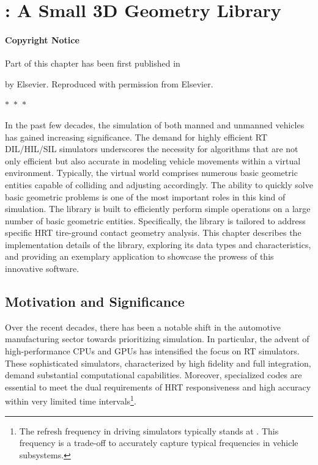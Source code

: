 
\chapter{\Acme{}: A Small 3D Geometry Library}
\label{app1:acme}

\subsubsection{Copyright Notice}
Part of this chapter has been first published in
%
\begin{center}
  \begin{minipage}{0.9\textwidth}
  \end{minipage}
\end{center}
%
by Elsevier. Reproduced with permission from Elsevier.

\begin{center}
  $\ast$~$\ast$~$\ast$
\end{center}

In the past few decades, the simulation of both manned and unmanned vehicles has gained increasing significance. The demand for highly efficient \ac{RT} \ac{DIL}/\ac{HIL}/\ac{SIL} simulators underscores the necessity for algorithms that are not only efficient but also accurate in modeling vehicle movements within a virtual environment. Typically, the virtual world comprises numerous basic geometric entities capable of colliding and adjusting accordingly. The ability to quickly solve basic geometric problems is one of the most important roles in this kind of simulation. The \Acme{} library is built to efficiently perform simple operations on a large number of basic geometric entities. Specifically, the library is tailored to address specific \ac{HRT} tire-ground contact geometry analysis. This chapter describes the implementation details of the \Acme{} library, exploring its data types and characteristics, and providing an exemplary application to showcase the prowess of this innovative software.


\section{Motivation and Significance}
\label{app1:acme_motivation}

Over the recent decades, there has been a notable shift in the automotive manufacturing sector towards prioritizing simulation. In particular, the advent of high-performance \acp{CPU} and \acp{GPU} has intensified the focus on \ac{RT} simulators. These sophisticated simulators, characterized by high fidelity and full integration, demand substantial computational capabilities. Moreover, specialized codes are essential to meet the dual requirements of \ac{HRT} responsiveness and high accuracy within very limited time intervals\footnote{The refresh frequency in driving simulators typically stands at . This frequency is a trade-off to accurately capture typical frequencies in vehicle subsystems.}.

